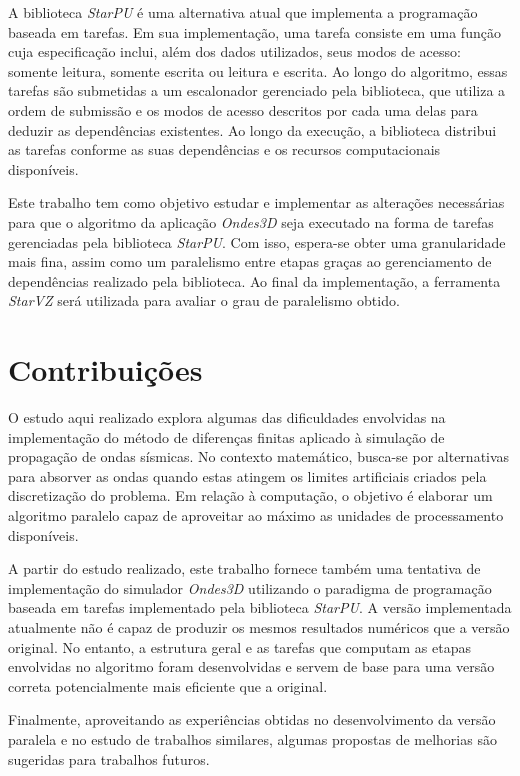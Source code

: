 \documentclass[cic,tc]{iiufrgs}
\begin{document}
A biblioteca \textit{StarPU} é uma alternativa atual que implementa a programação baseada em tarefas. Em sua implementação, uma tarefa consiste em uma função cuja especificação
inclui, além dos dados utilizados, seus modos de acesso: somente leitura, somente escrita ou leitura e escrita. Ao longo do algoritmo, essas tarefas são submetidas a um escalonador
gerenciado pela biblioteca, que utiliza a ordem de submissão e os modos de acesso descritos por cada uma delas para deduzir as dependências existentes. Ao longo da execução, a biblioteca
distribui as tarefas conforme as suas dependências e os recursos computacionais disponíveis.

Este trabalho tem como objetivo estudar e implementar as alterações necessárias para que o algoritmo da aplicação \textit{Ondes3D} seja executado na forma de tarefas gerenciadas
pela biblioteca \textit{StarPU}. Com isso, espera-se obter uma granularidade mais fina, assim como um paralelismo entre etapas graças ao gerenciamento de dependências realizado pela biblioteca. 
Ao final da implementação, a ferramenta \textit{StarVZ} será utilizada para avaliar o grau de paralelismo obtido.


\section{Contribuições}

O estudo aqui realizado explora algumas das dificuldades envolvidas na implementação do método de diferenças finitas aplicado à simulação de propagação de ondas sísmicas. No contexto matemático,
busca-se por alternativas para absorver as ondas quando estas atingem os limites artificiais criados pela discretização do problema. Em relação à computação, o objetivo é elaborar um algoritmo
paralelo capaz de aproveitar ao máximo as unidades de processamento disponíveis.

A partir do estudo realizado, este trabalho fornece também uma tentativa de implementação do simulador \textit{Ondes3D} utilizando o paradigma de programação baseada em tarefas implementado
pela biblioteca \textit{StarPU}. A versão implementada atualmente não é capaz de produzir os mesmos resultados numéricos que a versão original. No entanto,  a estrutura geral e 
as tarefas que computam as etapas envolvidas no algoritmo foram desenvolvidas e servem de base para uma versão correta potencialmente mais
eficiente que a original.

Finalmente, aproveitando as experiências obtidas no desenvolvimento da versão paralela e no estudo de trabalhos similares, algumas propostas de melhorias são sugeridas para trabalhos futuros.
\end{document}

